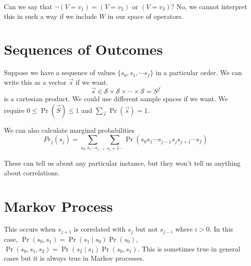 \documentclass[a4paper,twoside,master.tex]{subfiles}
\begin{document}
Can we say that $\neg(V=v_1)=(V=v_2)\text{ or }(V=v_3)$? No, we cannot
interpret this in such a way if we include $W$ in our space of
operators.

\section{Sequences of Outcomes}
\label{sec:sequences_of_outcomes}


Suppose we have a sequence of values $\{s_0,s_1,\cdots s_f\}$ in a
particular order. We can write this as a vector $\vec{s}$ if we want.
\begin{equation}
\vec{s}\in\mathcal{S}\times\mathcal{S}\times\cdots\times\mathcal{S} = S^f
\end{equation}
is a cartesian product. We could use different sample spaces if we want.
We require $0\leq \Pr(\vec{S})\leq 1$ and
$\sum_{\vec{s}}\Pr(\vec{s}) = 1$.

We can also calculate marginal probabilities
\begin{equation}
Pr_j(s_j) = \sum_{s_0,s_1\cdots s_{j-1}}\sum_{s_j+1\cdots}\Pr(s_0 s_1\cdots s_{j-1}s_js_{j+1}\cdots s_f)
\end{equation}

These can tell us about any particular instance, but they won't tell us
anything about correlations.

\section{Markov Process}
\label{sec:markov_process}

This occurs when $s_{j+1}$ is correlated with $s_j$ but not
$s_{j-i}$ where $i>0$. In this case,
$\Pr(s_0,s_1) = \Pr(s_1\mid s_0)\Pr(s_0)$,
$\Pr(s_0,s_1,s_2) = \Pr(s_2\mid s_1)\Pr(s_0,s_1)$. This is sometimes true
in general cases but it is always true in Markov processes.
\end{document}
